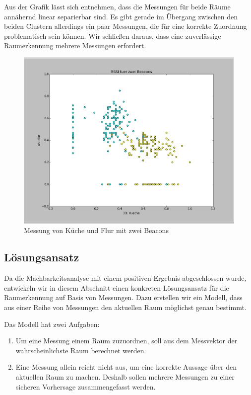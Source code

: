 Aus der Grafik lässt sich entnehmen, dass die Messungen für beide Räume
annähernd linear separierbar sind. Es gibt gerade im Übergang zwischen den beiden
Clustern allerdings ein paar Messungen, die für eine korrekte Zuordnung 
problematisch sein können. Wir schließen daraus, dass eine zuverlässige Raumerkennung mehrere Messungen erfordert.

\begin{figure}[tbh]
	\centering
	\includegraphics[width=1.0\linewidth]{Bilder/Messungen/KuecheFlur_1}
	\caption{Messung von Küche und Flur mit zwei Beacons}
	\label{fig:KuecheFlur_1}
\end{figure}

\subsection{Lösungsansatz}

Da die Machbarkeitsanalyse mit einem positiven Ergebnis abgeschlossen wurde,
entwickeln wir in diesem Abschnitt einen konkreten Lösungsansatz für die
Raumerkennung auf Basis von Messungen. Dazu erstellen wir ein Modell, dass aus
einer Reihe von Messungen den aktuellen Raum möglichst genau bestimmt.

Das Modell hat zwei Aufgaben:
\begin{enumerate}
	\item Um eine Messung einem Raum zuzuordnen, soll aus dem Messvektor der
		wahrscheinlichste Raum berechnet werden.
	\item Eine Messung allein reicht nicht aus, um eine korrekte Aussage über
		den aktuellen Raum zu machen. Deshalb sollen mehrere Messungen zu
		einer sicheren Vorhersage zusammengefasst werden.
\end{enumerate}

